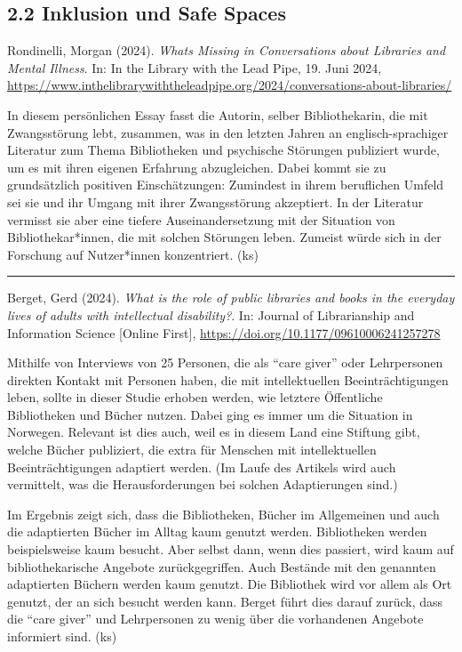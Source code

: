 \documentclass[a4paper,
fontsize=11pt,
oneside,
numbers=noperiodatend,
parskip=half-,
bibliography=totoc,
final
]{scrartcl}
\begin{document}
\subsection{2.2 Inklusion und Safe
Spaces}\label{inklusion-und-safe-spaces}

Rondinelli, Morgan (2024). \emph{What\textquotesingle s Missing in
Conversations about Libraries and Mental Illness}. In: In the Library
with the Lead Pipe, 19. Juni 2024,
\url{https://www.inthelibrarywiththeleadpipe.org/2024/conversations-about-libraries/}

In diesem persönlichen Essay fasst die Autorin, selber Bibliothekarin,
die mit Zwangsstörung lebt, zusammen, was in den letzten Jahren an
englisch-sprachiger Literatur zum Thema Bibliotheken und psychische
Störungen publiziert wurde, um es mit ihren eigenen Erfahrung
abzugleichen. Dabei kommt sie zu grundsätzlich positiven Einschätzungen:
Zumindest in ihrem beruflichen Umfeld sei sie und ihr Umgang mit ihrer
Zwangsstörung akzeptiert. In der Literatur vermisst sie aber eine
tiefere Auseinandersetzung mit der Situation von Bibliothekar*innen, die
mit solchen Störungen leben. Zumeist würde sich in der Forschung auf
Nutzer*innen konzentriert. (ks)

\begin{center}\rule{0.5\linewidth}{0.5pt}\end{center}

Berget, Gerd (2024). \emph{What is the role of public libraries and
books in the everyday lives of adults with intellectual disability?}.
In: Journal of Librarianship and Information Science {[}Online First{]},
\url{https://doi.org/10.1177/09610006241257278}

Mithilfe von Interviews von 25 Personen, die als ``care giver'' oder
Lehrpersonen direkten Kontakt mit Personen haben, die mit
intellektuellen Beeinträchtigungen leben, sollte in dieser Studie
erhoben werden, wie letztere Öffentliche Bibliotheken und Bücher nutzen.
Dabei ging es immer um die Situation in Norwegen. Relevant ist dies
auch, weil es in diesem Land eine Stiftung gibt, welche Bücher
publiziert, die extra für Menschen mit intellektuellen
Beeinträchtigungen adaptiert werden. (Im Laufe des Artikels wird auch
vermittelt, was die Herausforderungen bei solchen Adaptierungen sind.)

Im Ergebnis zeigt sich, dass die Bibliotheken, Bücher im Allgemeinen und
auch die adaptierten Bücher im Alltag kaum genutzt werden. Bibliotheken
werden beispielsweise kaum besucht. Aber selbst dann, wenn dies
passiert, wird kaum auf bibliothekarische Angebote zurückgegriffen. Auch
Bestände mit den genannten adaptierten Büchern werden kaum genutzt. Die
Bibliothek wird vor allem als Ort genutzt, der an sich besucht werden
kann. Berget führt dies darauf zurück, dass die ``care giver'' und
Lehrpersonen zu wenig über die vorhandenen Angebote informiert sind.
(ks)
\end{document}
